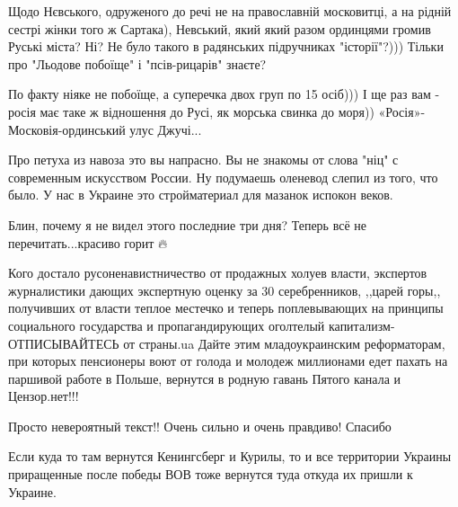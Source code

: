 \begin{itemize}
\begin{itemize}
Щодо Нєвського, одруженого до речі не на православній московитці, а на рідній
сестрі жінки того ж Сартака), Невський, який який разом ординцями громив Руські
міста? Ні? Не було такого в радянських підручниках "історії"?))) Тільки про
"Льодове побоїще" і "псів-рицарів" знаєте? 

По факту ніяке не побоїще, а суперечка двох груп по 15 осіб))) І ще раз вам -
росія має таке ж відношення до Русі, як морська свинка до моря))
«Росія»-Московія-ординський улус Джучі...

\end{itemize}

 
Про петуха из навоза это вы напрасно. Вы не знакомы от слова "ніц" с современным искусством России. Ну подумаешь оленевод слепил из того, что было. У нас в Украине это стройматериал для мазанок испокон веков.

 
Блин, почему я не видел этого последние три дня? Теперь всё не перечитать...красиво горит 🔥

 

Кого достало русоненавистничество от продажных холуев власти, экспертов
журналистики дающих экспертную оценку за 30 серебренников, ,,царей горы,,
получивших от власти теплое местечко и теперь поплевывающих на принципы
социального государства и пропагандирующих оголтелый капитализм- ОТПИСЫВАЙТЕСЬ
от страны.ua Дайте этим младоукраинским реформаторам, при которых пенсионеры
воют от голода и молодеж миллионами едет пахать на паршивой работе в Польше,
вернутся в родную гавань Пятого канала и Цензор.нет!!!

 
Просто невероятный текст!! Очень сильно и очень правдиво! Спасибо

 
Если куда то там вернутся Кенингсберг и Курилы, то и все территории Украины
приращенные после победы ВОВ тоже вернутся туда откуда их пришли к Украине.

\end{itemize}

